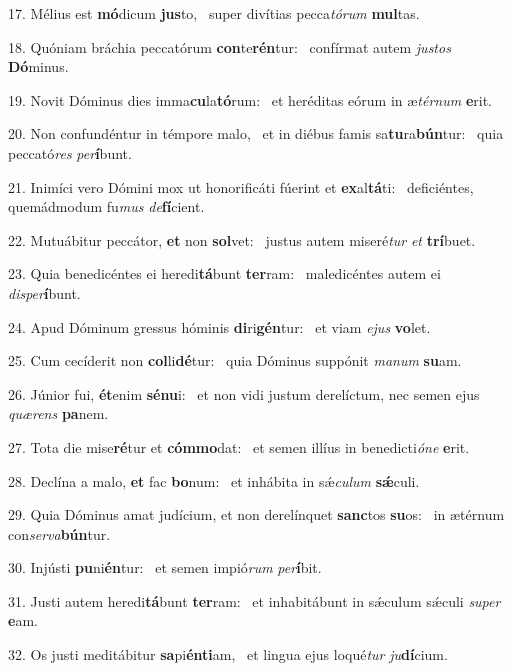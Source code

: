 17. Mélius est \textbf{mó}dicum \textbf{jus}to, \ast\  super divítias pecca\textit{tó}\textit{rum} \textbf{mul}tas.\

18. Quóniam bráchia peccatórum \textbf{con}te\textbf{rén}tur: \ast\  confírmat autem \textit{jus}\textit{tos} \textbf{Dó}minus.\

19. Novit Dóminus dies imma\textbf{cu}la\textbf{tó}rum: \ast\  et heréditas eórum in æ\textit{tér}\textit{num} \textbf{e}rit.\

20. Non confundéntur in témpore malo, \dag\  et in diébus famis sa\textbf{tu}ra\textbf{bún}tur: \ast\  quia peccató\textit{res} \textit{per}\textbf{í}bunt.\

21. Inimíci vero Dómini mox ut honorificáti fúerint et \textbf{ex}al\textbf{tá}ti: \ast\  deficiéntes, quemádmodum fu\textit{mus} \textit{de}\textbf{fí}cient.\

22. Mutuábitur peccátor, \textbf{et} non \textbf{sol}vet: \ast\  justus autem miseré\textit{tur} \textit{et} \textbf{trí}buet.\

23. Quia benedicéntes ei heredi\textbf{tá}bunt \textbf{ter}ram: \ast\  maledicéntes autem ei \textit{dis}\textit{per}\textbf{í}bunt.\

24. Apud Dóminum gressus hóminis \textbf{di}ri\textbf{gén}tur: \ast\  et viam \textit{e}\textit{jus} \textbf{vo}let.\

25. Cum cecíderit non \textbf{col}li\textbf{dé}tur: \ast\  quia Dóminus suppónit \textit{ma}\textit{num} \textbf{su}am.\

26. Júnior fui, \textbf{ét}enim \textbf{sé}\textbf{nu}i: \ast\  et non vidi justum derelíctum, nec semen ejus \textit{quæ}\textit{rens} \textbf{pa}nem.\

27. Tota die mise\textbf{ré}tur et \textbf{cóm}\textbf{mo}dat: \ast\  et semen illíus in benedicti\textit{ó}\textit{ne} \textbf{e}rit.\

28. Declína a malo, \textbf{et} fac \textbf{bo}num: \ast\  et inhábita in sǽ\textit{cu}\textit{lum} \textbf{sǽ}culi.\

29. Quia Dóminus amat judícium, et non derelínquet \textbf{sanc}tos \textbf{su}os: \ast\  in ætérnum con\textit{ser}\textit{va}\textbf{bún}tur.\

30. Injústi \textbf{pu}ni\textbf{én}tur: \ast\  et semen impió\textit{rum} \textit{per}\textbf{í}bit.\

31. Justi autem heredi\textbf{tá}bunt \textbf{ter}ram: \ast\  et inhabitábunt in sǽculum sǽculi \textit{su}\textit{per} \textbf{e}am.\

32. Os justi meditábitur \textbf{sa}pi\textbf{én}\textbf{ti}am, \ast\  et lingua ejus loqué\textit{tur} \textit{ju}\textbf{dí}cium.\

